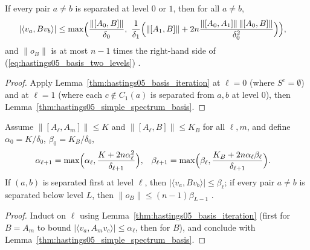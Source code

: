 \begin{lemma}
    \label{thm:hastings05_basis_two_levels}
    \leanok
    If every pair $a\ne b$ is separated at level $0$ or $1$, then for all
    $a\ne b$,
    \begin{align}
        |\langle v_a,Bv_b\rangle| & \le
        \max\Bigl(\frac{\|[A_0,B]\|}{\delta_0},\
        \frac{1}{\delta_1}\Bigl(\|[A_1,B]\|
        +2n\frac{\|[A_0,A_1]\|\,\|[A_0,B]\|}{\delta_0^2}\Bigr)\Bigr),
        \label{eq:hastings05_basis_two_levels}
    \end{align}
    and $\|o_B\|$ is at most $n-1$ times the right-hand side of
    (\ref{eq:hastings05_basis_two_levels})
    \cite[lines 1695--1705]{Hastings2006Solving}.
\end{lemma}
\begin{proof}\leanok
    Apply Lemma~\ref{thm:hastings05_basis_iteration} at $\ell=0$ (where
    $S^c=\emptyset$) and at $\ell=1$ (where each $c\notin C_1(a)$ is separated
    from $a,b$ at level $0$), then Lemma~\ref{thm:hastings05_simple_spectrum_basis}.
\end{proof}

\begin{lemma}
    \label{thm:hastings05_basis_levels}
    \leanok
    Assume $\|[A_\ell,A_m]\|\le K$ and $\|[A_\ell,B]\|\le K_B$ for all
    $\ell,m$, and define $\alpha_0=K/\delta_0$, $\beta_0=K_B/\delta_0$,
    \begin{align}
        \alpha_{\ell+1} & =\max\Bigl(\alpha_\ell,\frac{K+2n\alpha_\ell^2}{\delta_{\ell+1}}\Bigr),          &
        \beta_{\ell+1}  & =\max\Bigl(\beta_\ell,\frac{K_B+2n\alpha_\ell\beta_\ell}{\delta_{\ell+1}}\Bigr).
        \label{eq:hastings05_basis_levels_recurrence}
    \end{align}
    If $(a,b)$ is separated first at level $\ell$, then
    $|\langle v_a,Bv_b\rangle|\le\beta_\ell$; if every pair $a\ne b$ is
    separated below level $L$, then $\|o_B\|\le(n-1)\beta_{L-1}$
    \cite[lines 1695--1708]{Hastings2006Solving}.
\end{lemma}
\begin{proof}\leanok
    Induct on $\ell$ using Lemma~\ref{thm:hastings05_basis_iteration} (first
    for $B=A_m$ to bound $|\langle v_a,A_mv_c\rangle|\le\alpha_\ell$, then for
    $B$), and conclude with Lemma~\ref{thm:hastings05_simple_spectrum_basis}.
\end{proof}

